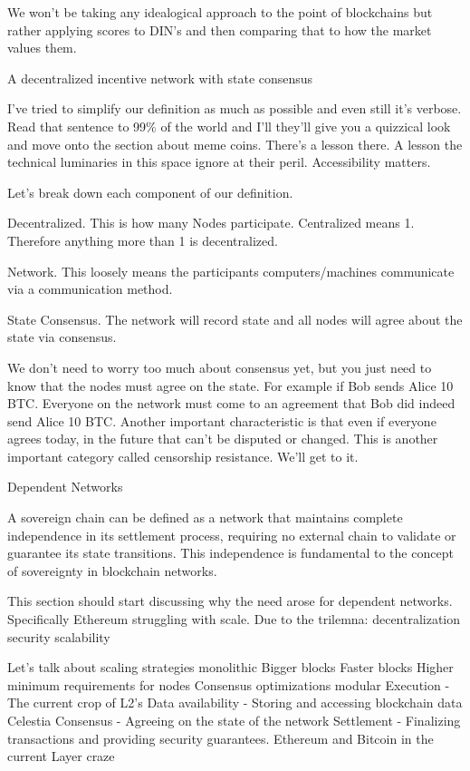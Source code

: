 \documentclass[
  letterpaper,
  DIV=11,
  numbers=noendperiod]{scrreprt}
\begin{document}
We won't be taking any idealogical approach to the point of blockchains
but rather applying scores to DIN's and then comparing that to how the
market values them.

A decentralized incentive network with state consensus

I've tried to simplify our definition as much as possible and even still
it's verbose. Read that sentence to 99\% of the world and I'll they'll
give you a quizzical look and move onto the section about meme coins.
There's a lesson there. A lesson the technical luminaries in this space
ignore at their peril. Accessibility matters.

Let's break down each component of our definition.

Decentralized. This is how many Nodes participate. Centralized means 1.
Therefore anything more than 1 is decentralized.

Network. This loosely means the participants computers/machines
communicate via a communication method.

State Consensus. The network will record state and all nodes will agree
about the state via consensus.

We don't need to worry too much about consensus yet, but you just need
to know that the nodes must agree on the state. For example if Bob sends
Alice 10 BTC. Everyone on the network must come to an agreement that Bob
did indeed send Alice 10 BTC. Another important characteristic is that
even if everyone agrees today, in the future that can't be disputed or
changed. This is another important category called censorship
resistance. We'll get to it.

Dependent Networks

A sovereign chain can be defined as a network that maintains complete
independence in its settlement process, requiring no external chain to
validate or guarantee its state transitions. This independence is
fundamental to the concept of sovereignty in blockchain networks.

This section should start discussing why the need arose for dependent
networks. Specifically Ethereum struggling with scale. Due to the
trilemna: decentralization security scalability

Let's talk about scaling strategies monolithic Bigger blocks Faster
blocks Higher minimum requirements for nodes Consensus optimizations
modular Execution - The current crop of L2's Data availability - Storing
and accessing blockchain data Celestia Consensus - Agreeing on the state
of the network Settlement - Finalizing transactions and providing
security guarantees. Ethereum and Bitcoin in the current Layer craze
\end{document}
